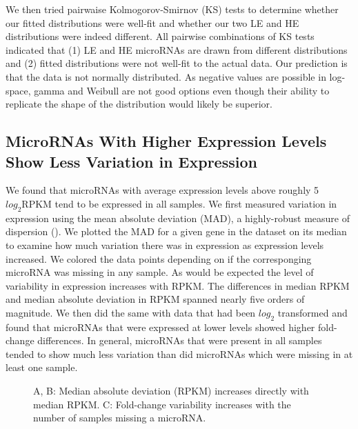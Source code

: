 \documentclass[12pt]{report}
\begin{document}
  We then tried pairwaise Kolmogorov-Smirnov (KS) tests to determine whether our fitted distributions were well-fit and whether our two LE and HE distributions were indeed different. All pairwise combinations of KS tests
  indicated that (1) LE and HE microRNAs are drawn from different distributions and (2) fitted distributions were not well-fit to the actual data. Our prediction is that the data is not normally distributed. As negative
  values are possible in log-space, gamma and Weibull are not good options even though their ability to replicate the shape of the distribution would likely be superior.


\subsection*{MicroRNAs With Higher Expression Levels Show Less Variation in Expression}
  We found that microRNAs with average expression levels above roughly 5 $log_{2} \text{RPKM}$ tend to be expressed in all samples. We first measured variation in expression
  using the mean absolute deviation (MAD), a highly-robust measure of dispersion (). We plotted the MAD for a given gene in the dataset on its median to examine how much variation there was in
  expression as expression levels increased. We colored the data points depending on if the corresponging microRNA was missing in any sample.
  As would be expected the level of variability in expression increases with RPKM. The differences in median RPKM and median absolute deviation in RPKM spanned nearly five orders of magnitude. 
  We then did the same with data that had been $log_{2}$ transformed
  and found that microRNAs that were expressed at lower levels showed higher fold-change differences. In general, microRNAs that were present in all samples
  tended to show much less variation than did microRNAs which were missing in at least one sample.
  
  \begin{figure}[H]
   \centering

    \caption{A, B: Median absolute deviation (RPKM) increases directly with median RPKM. C: Fold-change variability increases with the number of samples missing a microRNA.}
    \label{fig::mean_on_fig}
  \end{figure}
\end{document}
